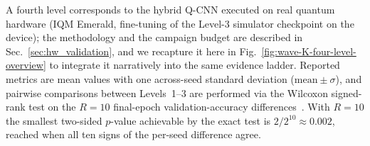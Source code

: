 A fourth level corresponds to the hybrid Q-CNN executed on real quantum
hardware (IQM Emerald, fine-tuning of the Level-3 simulator checkpoint
on the device); the methodology and the campaign budget are described
in Sec.~\ref{sec:hw_validation}, and we recapture it here in
Fig.~\ref{fig:wave-K-four-level-overview} to integrate it
narratively into the same evidence ladder. Reported metrics are mean
values with one across-seed standard deviation ($\mathrm{mean} \pm
\sigma$), and pairwise comparisons between Levels~1--3 are performed
via the Wilcoxon signed-rank test on the $R=10$ final-epoch
validation-accuracy differences~\cite{Wilcoxon1945}. With $R=10$ the
smallest two-sided $p$-value achievable by the exact test is
$2/2^{10}\approx 0.002$, reached when all ten signs of the per-seed
difference agree.

